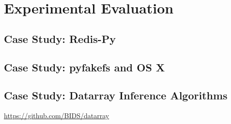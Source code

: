 \section{Experimental Evaluation}

\subsection {Case Study: Redis-Py}

\subsection {Case Study: pyfakefs and OS X}

\subsection{Case Study: Datarray Inference Algorithms}

\url{https://github.com/BIDS/datarray}